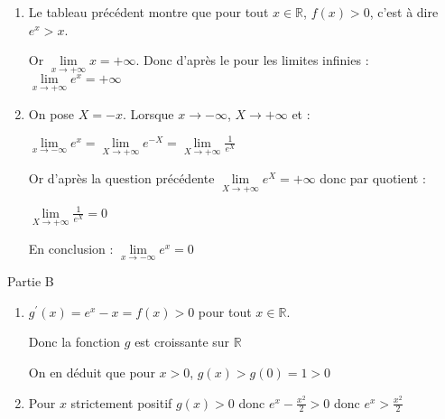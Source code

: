\begin{corrige}
\begin{enumerate}
\begin{center}
\begin{extern}
{
      }
   \end{extern}
\end{center}
\item
          Le tableau précédent montre que pour tout $x \in  \mathbb{R}$, $f\left(x\right) > 0$, c'est à dire $e^{x} > x$.
          \par
          Or $\lim\limits_{x\rightarrow +\infty }x=+\infty $. Donc d'après le   pour les limites infinies : $\lim\limits_{x\rightarrow +\infty }e^{x}=+\infty $
          \item
          On pose $X=-x$. Lorsque $x\rightarrow -\infty $, $X\rightarrow +\infty $ et :
          \par
          $\lim\limits_{x\rightarrow -\infty }e^{x}=\lim\limits_{X\rightarrow +\infty }e^{-X}=\lim\limits_{X\rightarrow +\infty }\frac{1}{e^{X}}$
          \par
          Or d'après la question précédente $\lim\limits_{X\rightarrow +\infty }e^{X}=+\infty $ donc par quotient :
          \par
          $\lim\limits_{X\rightarrow +\infty }\frac{1}{e^{X}}=0$
          \par
          En conclusion :  $\lim\limits_{x\rightarrow -\infty }e^{x}=0$
     \end{enumerate}
     \begin{h3}Partie B\end{h3}
     \begin{enumerate}
          \item
          $g^{\prime}\left(x\right)=e^{x}-x=f\left(x\right) > 0$ pour tout $x \in  \mathbb{R}$.
          \par
          Donc la fonction $g$ est croissante sur $\mathbb{R}$
          \par
          On en déduit que pour $x > 0$, $g\left(x\right) > g\left(0\right)=1 > 0$
          \item
          Pour $x$ strictement positif $g\left(x\right) > 0$ donc $e^{x}-\frac{x^{2}}{2} > 0$ donc $e^{x} > \frac{x^{2}}{2}$

\end{enumerate}
\end{corrige}
